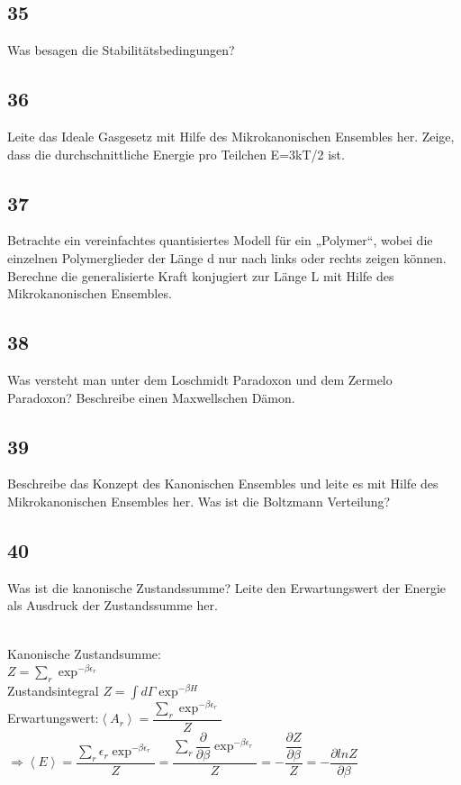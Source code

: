 \documentclass[12pt,a4paper]{report}
\newenvironment{myfrag}{\begin{it}}{\end{it}\vspace{3mm}\par}
\numberwithin{equation}{section}
\begin{document}
\subsection{35}
\begin{myfrag}
Was besagen die Stabilitätsbedingungen?
\end{myfrag}
\subsection{36}
\begin{myfrag}
Leite das Ideale Gasgesetz mit Hilfe des Mikrokanonischen Ensembles her.
Zeige, dass die durchschnittliche Energie pro Teilchen E=3kT/2 ist.
\end{myfrag}
\subsection{37}
\begin{myfrag}
Betrachte ein vereinfachtes quantisiertes Modell für ein „Polymer“, wobei die
einzelnen Polymerglieder der Länge d nur nach links oder rechts zeigen können.
Berechne die generalisierte Kraft konjugiert zur Länge L mit Hilfe des
Mikrokanonischen Ensembles.
\end{myfrag}
\subsection{38}
\begin{myfrag}
Was versteht man unter dem Loschmidt Paradoxon und dem Zermelo Paradoxon?
Beschreibe einen Maxwellschen Dämon.
\end{myfrag}
\subsection{39}
\begin{myfrag}
Beschreibe das Konzept des Kanonischen Ensembles und leite es mit Hilfe des
Mikrokanonischen Ensembles her. Was ist die Boltzmann Verteilung?
\end{myfrag}
\subsection{40}
\begin{myfrag}
Was ist die kanonische Zustandssumme? Leite den Erwartungswert der Energie
als Ausdruck der Zustandssumme her.
\end{myfrag} \quad \\
Kanonische Zustandsumme: \\
$ Z= \sum \limits_r \exp ^{-\beta \epsilon _r} $ \quad \\ Zustandsintegral  $Z = \int d \Gamma \exp ^{-\beta H} $ \\[1ex]
Erwartungswert:$ \left\langle A_r \right\rangle = \dfrac{\sum _r \exp ^{-\beta \epsilon _r}}{Z}$ \\[1ex]
$\Rightarrow \left\langle E \right\rangle = \dfrac{\sum _r \epsilon _r \exp ^{-\beta \epsilon _r}}{Z} = \dfrac{\sum _r \dfrac{\partial}{\partial \beta} \exp ^{-\beta \epsilon _r}}{Z} = -\dfrac{\dfrac{\partial Z}{\partial \beta}}{Z} = - \dfrac{\partial lnZ}{\partial \beta}$
\end{document}
